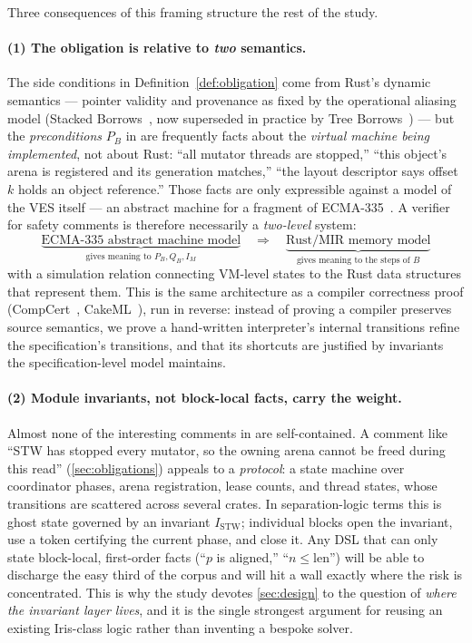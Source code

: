 Three consequences of this framing structure the rest of the study.

\paragraph{(1) The obligation is relative to \emph{two} semantics.}
The side conditions in Definition~\ref{def:obligation} come from Rust's
dynamic semantics --- pointer validity and provenance as fixed by the
operational aliasing model (Stacked Borrows~\cite{stackedborrows2019}, now
superseded in practice by Tree Borrows~\cite{treeborrows2025}) --- but the
\emph{preconditions} $P_B$ in \dotnetrs{} are frequently facts about the
\emph{virtual machine being implemented}, not about Rust: ``all mutator
threads are stopped,'' ``this object's arena is registered and its
generation matches,'' ``the layout descriptor says offset $k$ holds an
object reference.'' Those facts are only expressible against a model of the
VES itself --- an abstract machine for a fragment of
ECMA-335~\cite{ecma335}. A verifier for \dotnetrs{} safety comments is
therefore necessarily a \emph{two-level} system:
\[
  \underbrace{\text{ECMA-335 abstract machine model}}_{\text{gives meaning to } P_B, Q_B, I_M}
  \quad\Longrightarrow\quad
  \underbrace{\text{Rust/MIR memory model}}_{\text{gives meaning to the steps of } B}
\]
with a simulation relation connecting VM-level states to the Rust data
structures that represent them. This is the same architecture as a compiler
correctness proof (CompCert~\cite{compcert2009}, CakeML~\cite{cakeml2014}),
run in reverse: instead of proving a compiler preserves source semantics, we
prove a hand-written interpreter's internal transitions refine the
specification's transitions, and that its  shortcuts are
justified by invariants the specification-level model maintains.

\paragraph{(2) Module invariants, not block-local facts, carry the weight.}
Almost none of the interesting \safetyc{} comments in \dotnetrs{} are
self-contained. A comment like ``STW has stopped every mutator, so the
owning arena cannot be freed during this read''
(\cref{sec:obligations}) appeals to a \emph{protocol}: a
state machine over coordinator phases, arena registration, lease counts,
and thread states, whose transitions are scattered across several crates.
In separation-logic terms this is ghost state governed by an invariant
$I_{\mathrm{STW}}$; individual blocks open the invariant, use a token
certifying the current phase, and close it. Any DSL that can only state
block-local, first-order facts (``$p$ is aligned,'' ``$n \le \mathrm{len}$'')
will be able to discharge the easy third of the corpus and will hit a wall
exactly where the risk is concentrated. This is why the study devotes
\cref{sec:design} to the question of \emph{where the invariant layer
lives}, and it is the single strongest argument for reusing an existing
Iris-class logic rather than inventing a bespoke solver.

